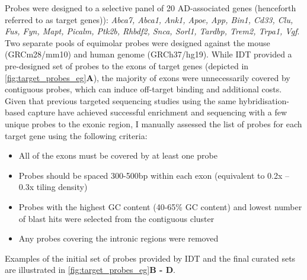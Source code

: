 
Probes were designed to a selective panel of 20 AD-associated genes (henceforth referred to as target genes)): \textit{Abca7, Abca1, Ank1, Apoe, App, Bin1, Cd33, Clu, Fus, Fyn, Mapt, Picalm, Ptk2b, Rhbdf2, Snca, Sorl1, Tardbp, Trem2, Trpa1, Vgf}. Two separate pools of equimolar probes were designed against the mouse (GRCm28/mm10) and human genome (GRCh37/hg19). While IDT provided a pre-designed set of probes to the exons of target genes (depicted in \cref{fig:target_probes_eg}\textbf{A}), the majority of exons were unnecessarily covered by contiguous probes, which can induce off-target binding and additional costs. Given that previous targeted sequencing studies using the same hybridisation-based capture have achieved successful enrichment and sequencing with a few unique probes to the exonic region\cite{Sheynkman2020}, I manually assessed the list of probes for each target gene using the following criteria:
\begin{itemize}
	\item All of the exons must be covered by at least one probe
	\item Probes should be spaced 300-500bp within each exon (equivalent to 0.2x – 0.3x tiling density) 
	\item Probes with the highest GC content (40-65\% GC content) and lowest number of blast hits were selected from the contiguous cluster 
	\item Any probes covering the intronic regions were removed
\end{itemize}
Examples of the initial set of probes provided by IDT and the final curated sets are illustrated in  \cref{fig:target_probes_eg}\textbf{B - D}. 

